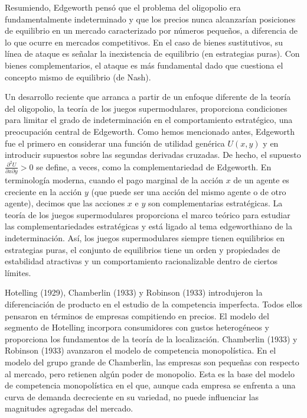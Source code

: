 \documentclass[10pt,a4paper]{article}
\begin{document}
Resumiendo, Edgeworth pensó que el problema del oligopolio era fundamentalmente indeterminado y que los precios nunca alcanzarían posiciones de equilibrio en un mercado caracterizado por números pequeños, a diferencia de lo que ocurre en mercados competitivos. En el caso de bienes sustitutivos, su línea de ataque es señalar la inexistencia de equilibrio (en estrategias puras). Con bienes complementarios, el ataque es más fundamental dado que cuestiona el concepto mismo de equilibrio (de Nash). 

Un desarrollo reciente que arranca a partir de un enfoque diferente de la teoría del oligopolio, la teoría de los juegos supermodulares, proporciona condiciones para limitar el grado de indeterminación en el comportamiento estratégico, una preocupación central de Edgeworth. Como hemos mencionado antes, Edgeworth fue el primero en considerar una función de utilidad genérica $U(x,y)$ y en introducir supuestos sobre las segundas derivadas cruzadas. De hecho, el supuesto $\frac{\partial^2 U}{\partial x\partial y}>0$ se define, a veces, como la complementariedad de Edgeworth. En terminología moderna, cuando el pago marginal de la acción $x$ de un agente es creciente en la acción $y$ (que puede ser una acción del mismo agente o de otro agente), decimos que las acciones $x$ e $y$ son complementarias estratégicas. La teoría de los juegos supermodulares proporciona el marco teórico para estudiar las complementariedades estratégicas y está ligado al tema edgeworthiano de la indeterminación. Así, los juegos supermodulares siempre tienen equilibrios en estrategias puras, el conjunto de equilibrios tiene un orden y propiedades de estabilidad atractivas y un comportamiento racionalizable dentro de ciertos límites. 

Hotelling (1929), Chamberlin (1933) y Robinson (1933) introdujeron la diferenciación de producto en el estudio de la competencia imperfecta. Todos ellos pensaron en términos de empresas compitiendo en precios. El modelo del segmento de Hotelling incorpora consumidores con gustos heterogéneos y proporciona los fundamentos de la teoría de la localización. Chamberlin (1933) y Robinson (1933) avanzaron el modelo de competencia monopolística. En el modelo del grupo grande de Chamberlin, las empresas son pequeñas con respecto al mercado, pero retienen algún poder de monopolio. Esta es la base del modelo de competencia monopolística en el que, aunque cada empresa se enfrenta a una curva de demanda decreciente en su variedad, no puede influenciar las magnitudes agregadas del mercado. 
\end{document}
